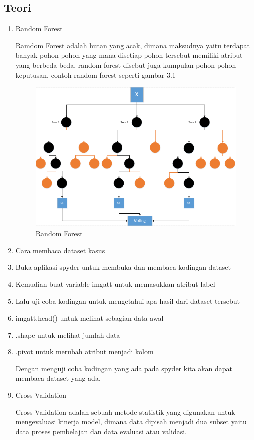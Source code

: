 \subsection {Teori}
\begin{enumerate}
\item Random Forest
\par
Ramdom Forest adalah hutan yang acak, dimana maksudnya yaitu terdapat banyak pohon-pohon yang mana disetiap pohon tersebut memiliki atribut yang berbeda-beda, random forest disebut juga kumpulan pohon-pohon keputusan. contoh random forest seperti gambar 3.1
\begin{figure}[ht]
\centering
\includegraphics[scale=0.6]{figures/RF/1_1.png}
\caption{Random Forest}
\end{figure}
\item Cara membaca dataset kasus
\item Buka aplikasi spyder untuk membuka dan membaca kodingan dataset
\item Kemudian buat  variable imgatt untuk memasukkan atribut label
\item Lalu uji coba kodingan untuk mengetahui apa hasil dari dataset tersebut
\item imgatt.head() untuk melihat sebagian data awal
\item .shape untuk melihat jumlah data
\item .pivot untuk merubah atribut menjadi kolom
\par
Dengan menguji coba kodingan yang ada pada spyder kita akan dapat membaca dataset yang ada.
\item Cross Validation
\par 
Cross Validation adalah sebuah metode statistik yang digunakan untuk mengevaluasi kinerja model, dimana data dipisah menjadi dua subset yaitu data proses pembelajan dan data evaluasi atau validasi.

\end{enumerate}
